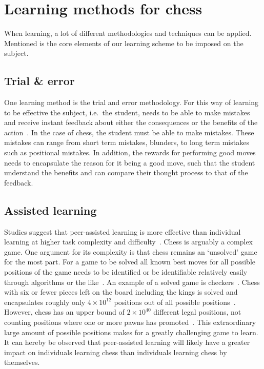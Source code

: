 \section{Learning methods for chess}\label{sec:learning-methods-for-chess}

When learning, a lot of different methodologies and techniques can be applied.
Mentioned is the core elements of our learning scheme to be imposed on the subject.


\subsection{Trial \& error}\label{subsec:trial-and-error}

One learning method is the trial and error methodology.
For this way of learning to be effective the subject, i.e.\ the student, needs to be able to make mistakes and receive
instant feedback about either the consequences or the benefits of the action~\cite{li2023}.
In the case of chess, the student must be able to make mistakes.
These mistakes can range from short term mistakes, blunders, to long term mistakes such as positional mistakes.
In addition, the rewards for performing good moves needs to encapsulate the reason for it being a good move, such that
the student understand the benefits and can compare their thought process to that of the feedback.


\subsection{Assisted learning}\label{subsec:assisted-learning}

Studies suggest that peer-assisted learning is more effective than individual learning at higher task complexity and
difficulty~\cite{carson2023}.
Chess is arguably a complex game.
One argument for its complexity is that chess remains an `unsolved' game for the most part.
For a game to be solved all known best moves for all possible positions of the game needs to be identified or be
identifiable relatively easily through algorithms or the like~\cite{herik2002}.
An example of a solved game is checkers~\cite{schaeffer2007}.
Chess with six or fewer pieces left on the board including the kings is solved and encapsulates roughly only
\( 4 \times 10^{12} \) positions out of all possible positions~\cite{syzygy2024}.
However, chess has an upper bound of \( 2 \times 10^{40} \) different legal positions, not counting positions where one
or more pawns has promoted~\cite{steinerberger2014}.
This extraordinary large amount of possible positions makes for a greatly challenging game to learn.
It can hereby be observed that peer-assisted learning will likely have a greater impact on individuals learning chess
than individuals learning chess by themselves.

